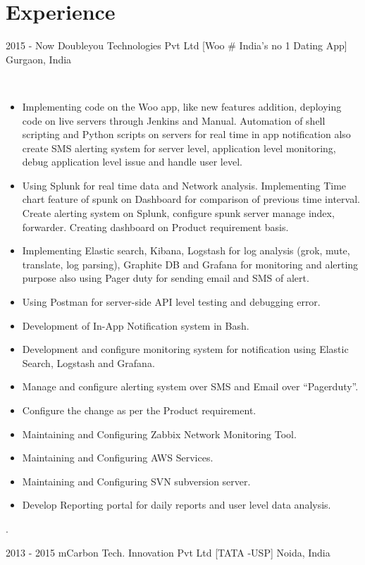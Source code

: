 \documentclass[]{cv-style}
\begin{document}
\section{Experience}
\begin{entrylist}
\entry
  {2015 - Now}
  {Doubleyou Technologies Pvt Ltd [Woo # India’s no 1 Dating App]}
  {Gurgaon, India}
  {\\
\begin{itemize}
\item Implementing code on the Woo app, like new features addition, deploying code on live servers through Jenkins and Manual. Automation of shell scripting and Python scripts on servers for real time in app notification also create SMS alerting system for server level, application level monitoring, debug application level issue and handle user level.
\item Using Splunk for real time data and Network analysis. Implementing Time chart feature of spunk on Dashboard for comparison of previous time interval. Create alerting system on Splunk, configure spunk server manage index, forwarder. Creating dashboard on Product requirement basis.
\item Implementing Elastic search, Kibana, Logstash for log analysis (grok, mute, translate, log parsing), Graphite DB and Grafana for monitoring and alerting purpose also using Pager duty for sending email and SMS of alert.
\item Using Postman for server-side API level testing and debugging error.
\item Development of In-App Notification system in Bash.
\item Development and configure monitoring system for notification using Elastic Search, Logstash and Grafana.
\item Manage and configure alerting system over SMS and Email over “Pagerduty”.
\item Configure the change as per the Product requirement.
\item Maintaining and Configuring Zabbix Network Monitoring Tool.
\item Maintaining and Configuring AWS Services.
\item Maintaining and Configuring SVN subversion server.
\item Develop Reporting portal for daily reports and user level data analysis.
\end{itemize}
.}
\entry
  {2013 - 2015}
  {mCarbon Tech. Innovation Pvt Ltd [TATA -USP]}
  {Noida, India}
  {\
}
\end{entrylist}
\end{document}
